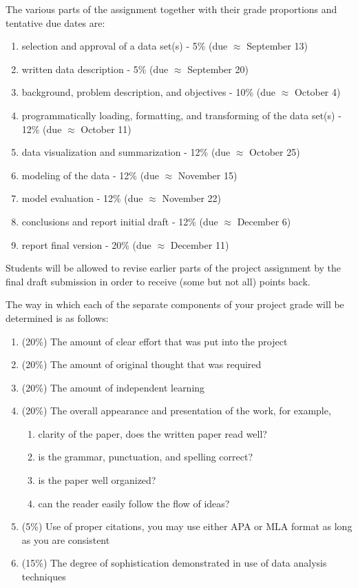 \documentclass[12pt]{article}
\begin{document}
The various parts of the assignment together with their grade proportions and tentative due dates are:
\begin{enumerate}
    \item selection and approval of a data set(s) - 5\% (due $\approx$ September 13)
    \item written data description - 5\% (due $\approx$ September 20)
    \item background, problem description, and objectives - 10\% (due $\approx$ October 4)
    \item programmatically loading, formatting, and transforming of the data set(s) - 12\% (due $\approx$ October 11)
    \item data visualization and summarization - 12\% (due $\approx$ October 25)
    \item modeling of the data - 12\% (due $\approx$ November 15)
    \item model evaluation - 12\% (due $\approx$ November 22)
    \item conclusions and report initial draft - 12\% (due $\approx$ December 6)
    \item report final version - 20\%  (due $\approx$ December 11)
\end{enumerate}
Students will be allowed to revise earlier parts of the project assignment by the final draft submission in order to receive (some but not all) points back.

The way in which each of the separate components of your project grade will be determined is as follows:
\begin{enumerate}
  \item (20\%) The amount of clear effort that was put into the project
  \item (20\%) The amount of original thought that was required
  \item (20\%) The amount of independent learning
  \item (20\%) The overall appearance and presentation of the work, for example,
  \begin{enumerate}
    \item clarity of the paper, does the written paper read well?
    \item is the grammar, punctuation, and spelling correct?
    \item is the paper well organized?
    \item can the reader easily follow the flow of ideas?
  \end{enumerate}
  \item (5\%) Use of proper citations, you may use either APA or MLA format as long as you are consistent
  \item (15\%)  The degree of sophistication demonstrated in use of data analysis techniques
\end{enumerate}
\end{document}
